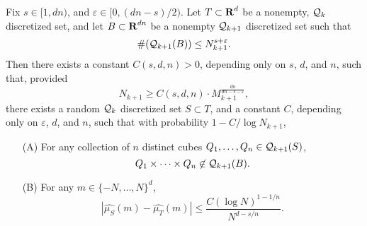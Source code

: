 \begin{theorem}
    Fix $s \in [1,dn)$, and $\varepsilon \in [0,(dn-s)/2)$. Let $T \subset \operatorname{\mathbf{R}}^d$ be a nonempty, $\operatorname{\mathcal{Q}}_k$ discretized set, and let $B \subset \operatorname{\mathbf{R}}^{dn}$ be a nonempty $\operatorname{\mathcal{Q}}_{k+1}$ discretized set such that
    \[ \#(\operatorname{\mathcal{Q}}_{k+1}(B)) \leq N_{k+1}^{s + \varepsilon}. \]
    Then there exists a constant $C(s,d,n) > 0$, depending only on $s$, $d$, and $n$, such that, provided
    \[ N_{k+1} \geq C(s,d,n) \cdot M_{k+1}^{\frac{dn}{dn - s - \varepsilon}}, \]
    there exists a random $\operatorname{\mathcal{Q}}_k$ discretized set $S \subset T$, and a constant $C$, depending only on $\varepsilon$, $d$, and $n$, such that with probability $1 - C/\log N_{k+1}$,
    \begin{enumerate}
        \item[(A)] For any collection of $n$ distinct cubes $Q_1, \dots, Q_n \in \operatorname{\mathcal{Q}}_{k+1}(S)$,
        \[ Q_1 \times \dots \times Q_n \not \in \operatorname{\mathcal{Q}}_{k+1}(B). \]

        \item[(B)] For any $m \in \{ -N, \dots, N \}^d$,
        \[ |\widehat{\mu_S}(m) - \widehat{\mu_T}(m)| \leq \frac{C (\log N)^{1 - 1/n}}{N^{d-s/n}}. \]
    \end{enumerate}
\end{theorem}
